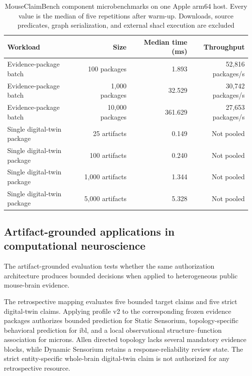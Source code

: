 \documentclass[11pt,a4paper]{article}
\begin{document}





\begin{table}[!htbp]
\centering
\caption{MouseClaimBench component microbenchmarks on one Apple arm64 host. Every value is the median of five repetitions after warm-up. Downloads, source predicates, graph serialization, and external \ac{shacl} execution are excluded}
\label{tab:scalability-results}
\footnotesize
\renewcommand{\arraystretch}{1.05}
\begin{tabularx}{\textwidth}{@{}Y r r r@{}}
\toprule
Workload & Size & Median time (ms) & Throughput \\
\midrule
Evidence-package batch & 100 packages & 1.893 & 52,816 packages/s \\
Evidence-package batch & 1,000 packages & 32.529 & 30,742 packages/s \\
Evidence-package batch & 10,000 packages & 361.629 & 27,653 packages/s \\
Single digital-twin package & 25 artifacts & 0.149 & Not pooled \\
Single digital-twin package & 100 artifacts & 0.240 & Not pooled \\
Single digital-twin package & 1,000 artifacts & 1.344 & Not pooled \\
Single digital-twin package & 5,000 artifacts & 5.328 & Not pooled \\
\bottomrule
\end{tabularx}
\end{table}




\FloatBarrier


\subsection{Artifact-grounded applications in computational neuroscience}
\label{subsec:application-results}

The artifact-grounded evaluation tests whether the same authorization
architecture produces bounded decisions when applied to heterogeneous public
mouse-brain evidence.

The retrospective mapping evaluates five bounded target claims and five
strict digital-twin claims. Applying profile v2 to the corresponding frozen
evidence packages authorizes bounded prediction for Static Sensorium,
topology-specific behavioral prediction for \ac{ibl}, and a local
observational structure--function association for \ac{microns}. Allen
directed topology lacks several mandatory evidence blocks, while Dynamic
Sensorium retains a response-reliability review state. The strict
entity-specific whole-brain digital-twin claim is not authorized for any
retrospective resource.
\end{document}
